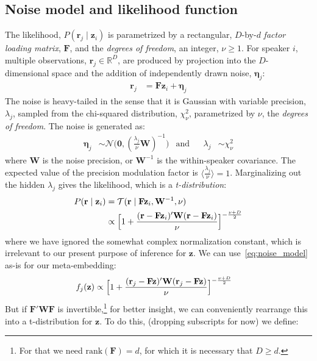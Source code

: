 \documentclass[a4paper,oneside,12pt,english]{report}
\def\zvec{\mathbf{z}}
\def\ND{\mathcal{N}}
\def\expp#1{\bigl\langle#1\bigr\rangle}
\def\R{\mathbb{R}}
\def\Wmat{\mathbf{W}}
\def\Fmat{\mathbf{F}}
\def\rvec{\mathbf{r}}
\def\nulvec{\boldsymbol{0}}
\begin{document}
\subsection{Noise model and likelihood function}
\def\etavec{\boldsymbol{\eta}}
\def\TD{\mathcal{T}}
The likelihood, $P(\rvec_j\mid\zvec_i)$ is parametrized by a rectangular, $D$-by-$d$ \emph{factor loading matrix}, $\Fmat$, and the \emph{degrees of freedom}, an integer, $\nu\ge1$. For speaker $i$, multiple observations, $\rvec_j\in\R^D$, are produced by projection into the $D$-dimensional space and the addition of independently drawn noise, $\etavec_j$:
\begin{align}
\rvec_j &= \Fmat\zvec_i + \etavec_j 
\end{align}
The noise is heavy-tailed in the sense that it is Gaussian with variable precision, $\lambda_j$, sampled from the chi-squared distribution, $\chi_\nu^2$, parametrized by $\nu$, the \emph{degrees of freedom}. The noise is generated as:
\begin{align}
\etavec_j&\sim \ND\bigl(\nulvec,(\frac{\lambda_j}{\nu}\Wmat)^{-1}\bigr) &\text{and} && \lambda_j &\sim \chi_\nu^2
\end{align}
where $\Wmat$ is the noise precision, or $\Wmat^{-1}$ is the within-speaker covariance. The expected value of the precision modulation factor is $\expp{\frac{\lambda_j}{\nu}}=1$. Marginalizing out the hidden $\lambda_j$ gives the likelihood, which is a \emph{t-distribution}:
\begin{align}
\label{eq:noise_model}
\begin{split}
P(\rvec\mid\zvec_i) &= \TD(\rvec\mid\Fmat\zvec_i,\Wmat^{-1},\nu) \\
&\propto \Bigl[1+\frac{(\rvec-\Fmat\zvec_i)'\Wmat(\rvec-\Fmat\zvec_i)}{\nu}\Bigr]^{-\frac{\nu+D}{2}}
\end{split}
\end{align}
where we have ignored the somewhat complex normalization constant, which is irrelevant to our present purpose of inference for $\zvec$. We can use~\eqref{eq:noise_model} as-is for our meta-embedding: 
\begin{align}
f_j(\zvec) &\propto \Bigl[1+\frac{(\rvec_j-\Fmat\zvec)'\Wmat(\rvec_j-\Fmat\zvec)}{\nu}\Bigr]^{-\frac{\nu+D}{2}}
\end{align}
But if $\Fmat'\Wmat\Fmat$ is invertible,\footnote{For that we need $\text{rank}(\Fmat)=d$, for which it is necessary that $D\ge d$.} for better insight, we can conveniently rearrange this into a t-distribution for $\zvec$. To do this, (dropping subscripts for now) we define: 
\end{document}
